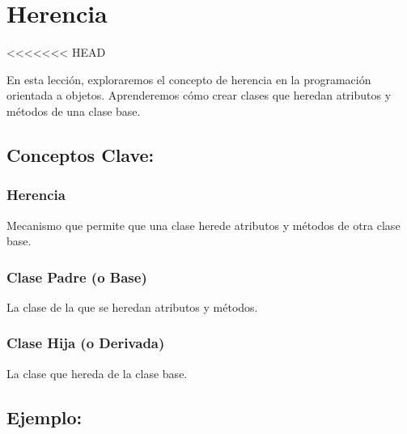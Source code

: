 \documentclass[
  a4paper,
  DIV=11,
  numbers=noendperiod,
  onepage,
  openany]{scrreprt}
\begin{document}
\hypertarget{herencia}{%
\chapter{Herencia}\label{herencia}}

\textless\textless\textless\textless\textless\textless\textless{} HEAD

En esta lección, exploraremos el concepto de herencia en la programación
orientada a objetos. Aprenderemos cómo crear clases que heredan
atributos y métodos de una clase base.

\hypertarget{conceptos-clave-56}{%
\section{Conceptos Clave:}\label{conceptos-clave-56}}

\hypertarget{herencia-1}{%
\subsection{Herencia}\label{herencia-1}}

Mecanismo que permite que una clase herede atributos y métodos de otra
clase base.

\hypertarget{clase-padre-o-base}{%
\subsection{Clase Padre (o Base)}\label{clase-padre-o-base}}

La clase de la que se heredan atributos y métodos.

\hypertarget{clase-hija-o-derivada}{%
\subsection{Clase Hija (o Derivada)}\label{clase-hija-o-derivada}}

La clase que hereda de la clase base.

\hypertarget{ejemplo-56}{%
\section{Ejemplo:}\label{ejemplo-56}}
\end{document}
